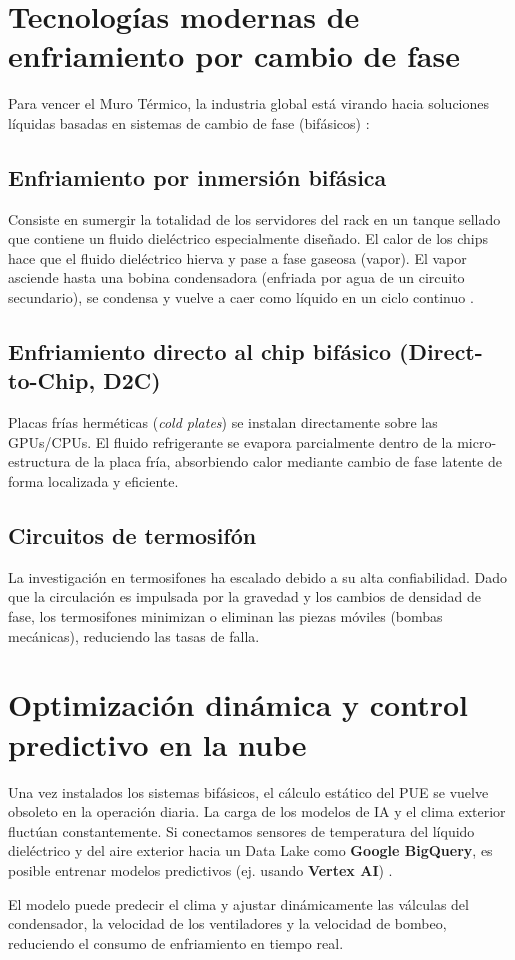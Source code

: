 \section{Tecnolog\'ias modernas de enfriamiento por cambio de fase}
Para vencer el Muro T\'ermico, la industria global est\'a virando hacia soluciones l\'iquidas basadas en sistemas de cambio de fase (bif\'asicos) \cite{mudawar2001}:

\subsection{Enfriamiento por inmersi\'on bif\'asica}
Consiste en sumergir la totalidad de los servidores del rack en un tanque sellado que contiene un fluido diel\'ectrico especialmente dise\~nado. El calor de los chips hace que el fluido diel\'ectrico hierva y pase a fase gaseosa (vapor). El vapor asciende hasta una bobina condensadora (enfriada por agua de un circuito secundario), se condensa y vuelve a caer como l\'iquido en un ciclo continuo \cite{mudawar2001}.

\subsection{Enfriamiento directo al chip bif\'asico (Direct-to-Chip, D2C)}
Placas fr\'ias herm\'eticas (\emph{cold plates}) se instalan directamente sobre las GPUs/CPUs. El fluido refrigerante se evapora parcialmente dentro de la micro-estructura de la placa fr\'ia, absorbiendo calor mediante cambio de fase latente de forma localizada y eficiente.

\subsection{Circuitos de termosif\'on}
La investigaci\'on en termosifones ha escalado debido a su alta confiabilidad. Dado que la circulaci\'on es impulsada por la gravedad y los cambios de densidad de fase, los termosifones minimizan o eliminan las piezas m\'oviles (bombas mec\'anicas), reduciendo las tasas de falla.

\section{Optimizaci\'on din\'amica y control predictivo en la nube}
Una vez instalados los sistemas bif\'asicos, el c\'alculo est\'atico del PUE se vuelve obsoleto en la operaci\'on diaria. La carga de los modelos de IA y el clima exterior fluct\'uan constantemente. Si conectamos sensores de temperatura del l\'iquido diel\'ectrico y del aire exterior hacia un Data Lake como \textbf{Google BigQuery}, es posible entrenar modelos predictivos (ej. usando \textbf{Vertex AI}) \cite{google2014}. 

El modelo puede predecir el clima y ajustar din\'amicamente las v\'alculas del condensador, la velocidad de los ventiladores y la velocidad de bombeo, reduciendo el consumo de enfriamiento en tiempo real.
